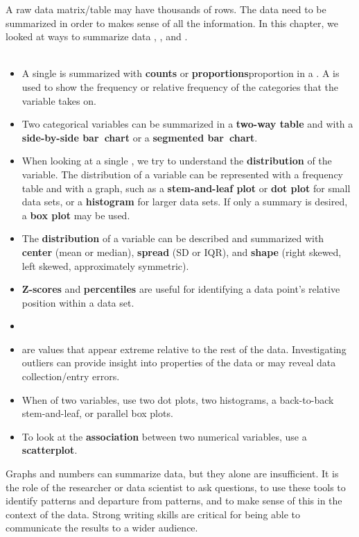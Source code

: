 \noindent A raw data matrix/table may have thousands of rows.  The data need to be summarized in order to makes sense of all the information.  In this chapter, we looked at ways to summarize data , , and .  
\\
\\
\begin{itemize}

\item A single  is summarized with \textbf{counts} or \textbf{proportions}{proportion} in a .  A  is used to show the frequency or relative frequency of the categories that the variable takes on.
\item Two categorical variables can be summarized in a \textbf{two-way table} and with a \textbf{side-by-side bar~chart} or a \textbf{segmented bar~chart}.
\end{itemize}
\begin{itemize}
\item When looking at a single , we try to understand the \textbf{distribution} of the variable.  The distribution of a variable can be represented with a frequency table and with a graph, such as a \textbf{stem-and-leaf plot} or \textbf{dot plot} for small data sets, or a \textbf {histogram} for larger data sets.  If only a summary is desired, a \textbf{box plot} may be used.
\item The \textbf{distribution} of a variable can be described and summarized with \textbf{center} (mean or median), \textbf{spread} (SD or IQR), and \textbf{shape} (right skewed, left skewed, approximately symmetric). 
\item \textbf{Z-scores} and \textbf{percentiles} are useful for identifying a data point's relative position within a data set.
\item {}
\item {} are values that appear extreme relative to the rest of the data.  Investigating outliers can provide insight into properties of the data or may reveal data collection/entry errors.

\item When  of two variables, use two dot plots, two histograms, a back-to-back stem-and-leaf, or parallel box plots.
\item To look at the \textbf{association} between two numerical variables, use a \textbf{scatterplot}.
\end{itemize}
Graphs and numbers can summarize data, but they alone are insufficient.  It is the role of the researcher or data scientist to ask questions, to use these tools to identify patterns and departure from patterns, and to make sense of this in the context of the data.  Strong writing skills are critical for being able to communicate the results to a wider audience.  

